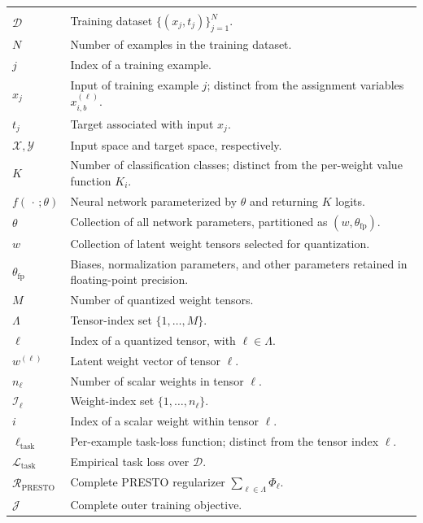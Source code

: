 \documentclass{article}
\begin{document}
\begin{longtable}{>{\raggedright\arraybackslash}p{}
                  >{\raggedright\arraybackslash}p{}}
  \multicolumn{2}{l}{\textit{Data, network, and indexing}}\\*
  $\mathcal D$ & Training dataset $\{(x_j,t_j)\}_{j=1}^{N}$. \\
  $N$ & Number of examples in the training dataset. \\
  $j$ & Index of a training example. \\
  $x_j$ & Input of training example $j$; distinct from the assignment variables $x_{i,b}^{(\ell)}$. \\
  $t_j$ & Target associated with input $x_j$. \\
  $\mathcal X,\mathcal Y$ & Input space and target space, respectively. \\
  $K$ & Number of classification classes; distinct from the per-weight value function $K_i$. \\
  $f(\,\cdot\,;\theta)$ & Neural network parameterized by $\theta$ and returning $K$ logits. \\
  $\theta$ & Collection of all network parameters, partitioned as $(w,\theta_{\mathrm{fp}})$. \\
  $w$ & Collection of latent weight tensors selected for quantization. \\
  $\theta_{\mathrm{fp}}$ & Biases, normalization parameters, and other parameters retained in floating-point precision. \\
  $M$ & Number of quantized weight tensors. \\
  $\Lambda$ & Tensor-index set $\{1,\ldots,M\}$. \\
  $\ell$ & Index of a quantized tensor, with $\ell\in\Lambda$. \\
  $w^{(\ell)}$ & Latent weight vector of tensor $\ell$. \\
  $n_\ell$ & Number of scalar weights in tensor $\ell$. \\
  $\mathcal I_\ell$ & Weight-index set $\{1,\ldots,n_\ell\}$. \\
  $i$ & Index of a scalar weight within tensor $\ell$. \\
  $\ell_{\mathrm{task}}$ & Per-example task-loss function; distinct from the tensor index $\ell$. \\
  $\mathcal L_{\mathrm{task}}$ & Empirical task loss over $\mathcal D$. \\
  $\mathcal R_{\mathrm{PRESTO}}$ & Complete PRESTO regularizer $\sum_{\ell\in\Lambda}\Phi_\ell$. \\
  $\mathcal J$ & Complete outer training objective. \\


\end{longtable}
\end{document}
